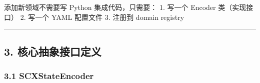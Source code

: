 \documentclass[
  12pt,
]{ctexart}
\begin{document}
添加新领域不需要写 Python 集成代码，只需要： 1. 写一个 Encoder
类（实现接口） 2. 写一个 YAML 配置文件 3. 注册到 domain registry

\begin{center}\rule{0.5\linewidth}{0.5pt}\end{center}

\subsection{3.
核心抽象接口定义}\label{ux6838ux5fc3ux62bdux8c61ux63a5ux53e3ux5b9aux4e49}

\subsubsection{3.1 SCXStateEncoder}\label{scxstateencoder}
\end{document}
